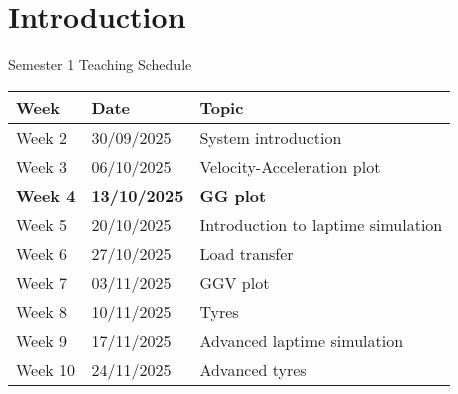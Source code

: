 \section*{Introduction}

\begin{frame}{Semester 1 Teaching Schedule}
    \begin{table}
        \renewcommand{\arraystretch}{1.5}
        \begin{tabular}{l l l}
            \textbf{Week} & \textbf{Date} & \textbf{Topic} \\
            \hline
            Week 2 & 30/09/2025 & System introduction \\
            Week 3 & 06/10/2025 & Velocity-Acceleration plot \\
            \textbf{Week 4} & \textbf{13/10/2025} & \textbf{GG plot} \\
            Week 5 & 20/10/2025 & Introduction to laptime simulation \\
            Week 6 & 27/10/2025 & Load transfer \\
            Week 7 & 03/11/2025 & GGV plot \\
            Week 8 & 10/11/2025 & Tyres \\
            Week 9 & 17/11/2025 & Advanced laptime simulation \\
            Week 10& 24/11/2025 & Advanced tyres
        \end{tabular}
    \end{table}
\end{frame}